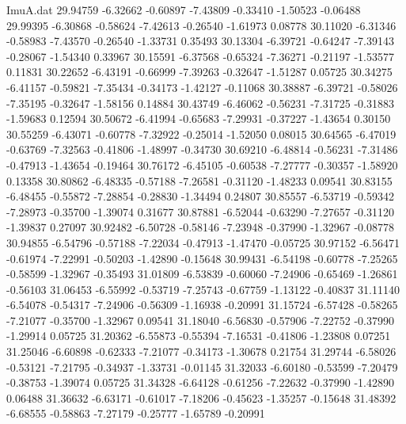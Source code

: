 \begin{filecontents}{ImuA.dat}
  29.94759   -6.32662   -0.60897   -7.43809   -0.33410   -1.50523   -0.06488
  29.99395   -6.30868   -0.58624   -7.42613   -0.26540   -1.61973    0.08778
  30.11020   -6.31346   -0.58983   -7.43570   -0.26540   -1.33731    0.35493
  30.13304   -6.39721   -0.64247   -7.39143   -0.28067   -1.54340    0.33967
  30.15591   -6.37568   -0.65324   -7.36271   -0.21197   -1.53577    0.11831
  30.22652   -6.43191   -0.66999   -7.39263   -0.32647   -1.51287    0.05725
  30.34275   -6.41157   -0.59821   -7.35434   -0.34173   -1.42127   -0.11068
  30.38887   -6.39721   -0.58026   -7.35195   -0.32647   -1.58156    0.14884
  30.43749   -6.46062   -0.56231   -7.31725   -0.31883   -1.59683    0.12594
  30.50672   -6.41994   -0.65683   -7.29931   -0.37227   -1.43654    0.30150
  30.55259   -6.43071   -0.60778   -7.32922   -0.25014   -1.52050    0.08015
  30.64565   -6.47019   -0.63769   -7.32563   -0.41806   -1.48997   -0.34730
  30.69210   -6.48814   -0.56231   -7.31486   -0.47913   -1.43654   -0.19464
  30.76172   -6.45105   -0.60538   -7.27777   -0.30357   -1.58920    0.13358
  30.80862   -6.48335   -0.57188   -7.26581   -0.31120   -1.48233    0.09541
  30.83155   -6.48455   -0.55872   -7.28854   -0.28830   -1.34494    0.24807
  30.85557   -6.53719   -0.59342   -7.28973   -0.35700   -1.39074    0.31677
  30.87881   -6.52044   -0.63290   -7.27657   -0.31120   -1.39837    0.27097
  30.92482   -6.50728   -0.58146   -7.23948   -0.37990   -1.32967   -0.08778
  30.94855   -6.54796   -0.57188   -7.22034   -0.47913   -1.47470   -0.05725
  30.97152   -6.56471   -0.61974   -7.22991   -0.50203   -1.42890   -0.15648
  30.99431   -6.54198   -0.60778   -7.25265   -0.58599   -1.32967   -0.35493
  31.01809   -6.53839   -0.60060   -7.24906   -0.65469   -1.26861   -0.56103
  31.06453   -6.55992   -0.53719   -7.25743   -0.67759   -1.13122   -0.40837
  31.11140   -6.54078   -0.54317   -7.24906   -0.56309   -1.16938   -0.20991
  31.15724   -6.57428   -0.58265   -7.21077   -0.35700   -1.32967    0.09541
  31.18040   -6.56830   -0.57906   -7.22752   -0.37990   -1.29914    0.05725
  31.20362   -6.55873   -0.55394   -7.16531   -0.41806   -1.23808    0.07251
  31.25046   -6.60898   -0.62333   -7.21077   -0.34173   -1.30678    0.21754
  31.29744   -6.58026   -0.53121   -7.21795   -0.34937   -1.33731   -0.01145
  31.32033   -6.60180   -0.53599   -7.20479   -0.38753   -1.39074    0.05725
  31.34328   -6.64128   -0.61256   -7.22632   -0.37990   -1.42890    0.06488
  31.36632   -6.63171   -0.61017   -7.18206   -0.45623   -1.35257   -0.15648
  31.48392   -6.68555   -0.58863   -7.27179   -0.25777   -1.65789   -0.20991

\end{filecontents}
